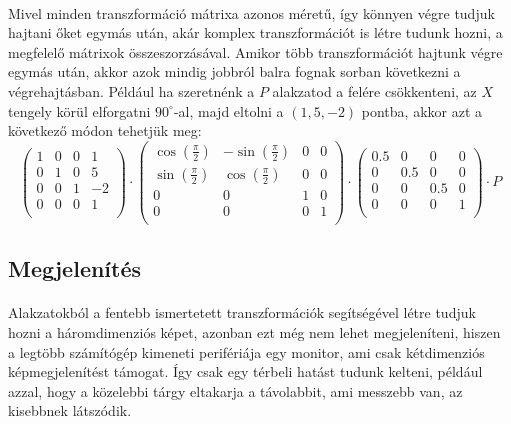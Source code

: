 \documentclass[12pt]{report}
\begin{document}
\paragraph{}
Mivel minden transzformáció mátrixa azonos méretű, így könnyen végre tudjuk hajtani őket egymás után, akár komplex transzformációt is létre tudunk hozni, a megfelelő mátrixok összeszorzásával. Amikor több transzformációt hajtunk végre egymás után, akkor azok mindig jobbról balra fognak sorban következni a végrehajtásban. Például ha szeretnénk a $P$ alakzatod a felére csökkenteni, az $X$ tengely körül elforgatni $90^{\circ}$-al, majd eltolni a $(1,5,-2)$ pontba, akkor azt a következő módon tehetjük meg:
$$
\left( \begin{array}{cccc}
	1 & 0 & 0 & 1 \\
	0 & 1 & 0 & 5 \\
	0 & 0 & 1 & -2 \\
	0 & 0 & 0 & 1 \\
\end{array} \right)
\cdot
\left( \begin{array}{cccc}
	\cos(\frac{\pi}{2}) & -\sin(\frac{\pi}{2}) & 0 & 0 \\
	\sin(\frac{\pi}{2}) & \cos(\frac{\pi}{2}) & 0 & 0 \\
	0 & 0 & 1 & 0 \\
	0 & 0 & 0 & 1 \\
\end{array} \right)
\cdot
\left( \begin{array}{cccc}
	0.5 & 0 & 0 & 0 \\
	0 & 0.5 & 0 & 0 \\
	0 & 0 & 0.5 & 0 \\
	0 & 0 & 0 & 1 \\
\end{array} \right)
\cdot
P
$$

\subsection{Megjelenítés}
\paragraph{}
Alakzatokból a fentebb ismertetett transzformációk segítségével létre tudjuk hozni a háromdimenziós képet, azonban ezt még nem lehet megjeleníteni, hiszen a legtöbb számítógép kimeneti perifériája egy monitor, ami csak kétdimenziós képmegjelenítést támogat. Így csak egy térbeli hatást tudunk kelteni, például azzal, hogy a közelebbi tárgy eltakarja a távolabbit, ami messzebb van, az kisebbnek látszódik.
\end{document}
